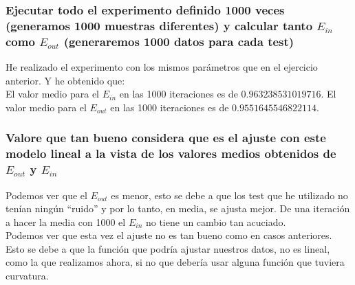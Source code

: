 \documentclass[12pt,a4paper]{article}
\begin{document}
\subsubsection{Ejecutar todo el experimento definido 1000 veces (generamos 1000	muestras diferentes) y calcular tanto $E_{in}$ como $E_{out}$ (generaremos 1000 datos para cada test)}
He realizado el experimento con los mismos parámetros que en el ejercicio anterior. Y he obtenido que:\\
El valor medio para el $E_{in}$ en las 1000 iteraciones es de $0.963238531019716$.
El valor medio para el $E_{out}$ en las 1000 iteraciones es de $0.9551645546822114$.

\subsubsection{Valore que tan bueno considera que es el ajuste con este modelo lineal a la vista	de los valores medios obtenidos de $E_{out}$ y $E_{in}$}
Podemos ver que el $E_{out}$ es menor, esto se debe a que los test que he utilizado no tenían ningún ``ruido'' y por lo tanto, en media, se ajusta mejor. De una iteración a hacer la media con 1000 el $E_{in}$ no tiene un cambio tan acuciado.\\ Podemos ver que esta vez el ajuste no es tan bueno como en casos anteriores. Esto se debe a que la función que podría ajustar nuestros datos, no es lineal, como la que realizamos ahora, si no que debería usar alguna función que tuviera curvatura.
\end{document}
